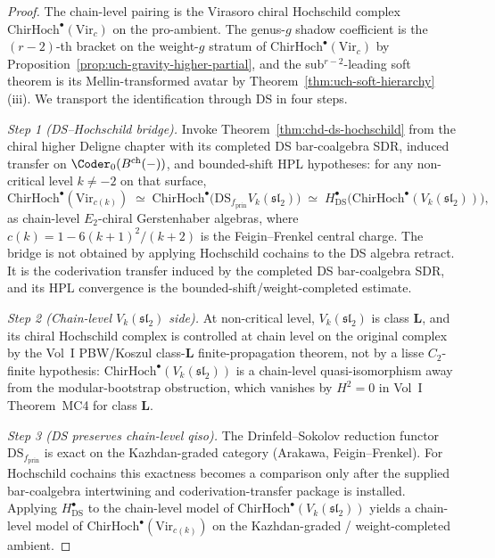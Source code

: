 \begin{proof}
The chain-level pairing is the Virasoro chiral Hochschild complex
$\mathrm{ChirHoch}^\bullet(\mathrm{Vir}_c)$ on the pro-ambient. The
genus-$g$ shadow coefficient is the $(r{-}2)$-th bracket on the
weight-$g$ stratum of $\mathrm{ChirHoch}^\bullet(\mathrm{Vir}_c)$ by
Proposition~\ref{prop:uch-gravity-higher-partial}, and the
sub${}^{r-2}$-leading soft theorem is its Mellin-transformed avatar
by Theorem~\ref{thm:uch-soft-hierarchy}\,(iii). We transport the
identification through DS in four steps.

	\emph{Step 1 (DS--Hochschild bridge).} Invoke
Theorem~\ref{thm:chd-ds-hochschild} from the chiral higher Deligne
chapter with its completed DS bar-coalgebra SDR, induced transfer on
\(\Coder_0(B^{\mathrm{ch}}(-))\), and bounded-shift HPL hypotheses:
for any non-critical level $k \neq -2$ on that surface,
\[
\mathrm{ChirHoch}^\bullet(\mathrm{Vir}_{c(k)})
\;\simeq\;
\mathrm{ChirHoch}^\bullet\!\bigl(\mathrm{DS}_{f_{\mathrm{prin}}} V_k(\mathfrak{sl}_2)\bigr)
\;\simeq\;
H^\bullet_{\mathrm{DS}}\!\bigl(\mathrm{ChirHoch}^\bullet(V_k(\mathfrak{sl}_2))\bigr),
\]
as chain-level $E_2$-chiral Gerstenhaber algebras, where
$c(k) = 1 - 6(k+1)^2/(k+2)$ is the Feigin--Frenkel central charge.
The bridge is not obtained by applying Hochschild cochains to the DS
algebra retract.  It is the coderivation transfer induced by the
completed DS bar-coalgebra SDR, and its HPL convergence is the
bounded-shift/weight-completed estimate.

\emph{Step 2 (Chain-level $V_k(\mathfrak{sl}_2)$ side).} At
non-critical level, $V_k(\mathfrak{sl}_2)$ is class $\mathbf L$, and its
chiral Hochschild complex is controlled at chain level on the original
complex by the Vol~I PBW/Koszul class-$\mathbf L$ finite-propagation
theorem, not by a lisse \(C_2\)-finite hypothesis:
$\mathrm{ChirHoch}^\bullet(V_k(\mathfrak{sl}_2))$ is a chain-level
quasi-isomorphism away from the modular-bootstrap obstruction, which
vanishes by $H^2 = 0$ in Vol~I Theorem~MC4 for class $\mathbf L$.

\emph{Step 3 (DS preserves chain-level qiso).} The Drinfeld--Sokolov
reduction functor $\mathrm{DS}_{f_{\mathrm{prin}}}$ is exact on the
Kazhdan-graded category (Arakawa, Feigin--Frenkel).  For Hochschild
cochains this exactness becomes a comparison only after the supplied
bar-coalgebra intertwining and coderivation-transfer package is
installed.  Applying $H^\bullet_{\mathrm{DS}}$ to the chain-level model of
$\mathrm{ChirHoch}^\bullet(V_k(\mathfrak{sl}_2))$ yields a chain-level
model of $\mathrm{ChirHoch}^\bullet(\mathrm{Vir}_{c(k)})$ on the
Kazhdan-graded / weight-completed ambient.


\end{proof}
